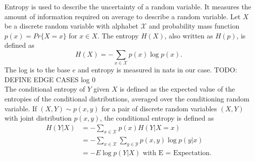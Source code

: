 Entropy is used to describe the uncertainty of a random variable. It measures the amount of information required on average to describe a random variable. Let $X$ be a discrete random variable with alphabet $\mathcal{X}$ and probability mass function $p(x)=Pr\{X=x\}$ for $x\in X$.
The entropy $H(X)$, also written as $H(p)$, is defined as
\begin{equation}
    H(X) = -\sum_{x \in \mathcal{X}} p(x) \log p(x).
\end{equation}
The log is to the base $e$ and entropy is measured in nats in our case. TODO: DEFINE EDGE CASES log 0 %
\\
The conditional entropy of $Y$ given $X$ is defined as the expected value of the entropies of the conditional distributions, averaged over the conditioning random variable. If $(X,Y) \sim p(x,y)$ for a pair of discrete random variables $(X,Y)$ with joint distribution $p(x,y)$, the conditional entropy is defined as \\
\begin{align}
    H(Y|X)&= -\sum_{x \in \mathcal{X}} p(x) H(Y|X=x) \\
    &= - \sum_{x \in \mathcal{X}} \sum_{y \in \mathcal{Y}}p(x,y) \log p(y|x) \\
    &= -E \log p(Y|X) \text{ with E = Expectation}.
\end{align}

